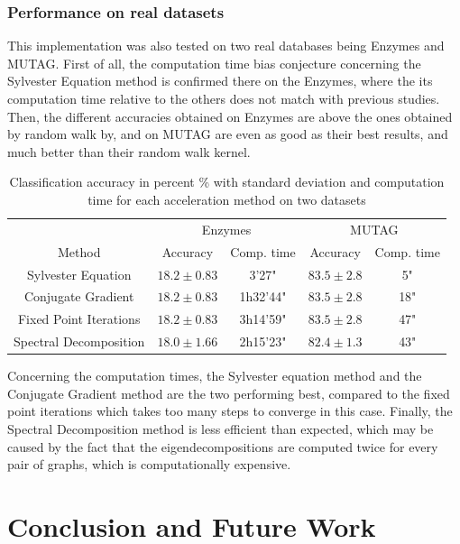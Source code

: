 \documentclass{article}
\theoremstyle{definition}
\begin{document}
\subsubsection{Performance on real datasets}
This implementation was also tested on two real databases being Enzymes and MUTAG. First of all, the computation time bias conjecture concerning the Sylvester Equation method is confirmed there on the Enzymes, where the its computation time relative to the others does not match with previous studies\cite{vishwanathan_graph_2010,shervashidze_efficient_2009}. Then, the different accuracies obtained on Enzymes are above the ones obtained by random walk by\cite{shervashidze_efficient_2009}, and on MUTAG are even as good as their best results, and much better than their random walk kernel.
\begin{table}[!htb]
	\begin{center}
		\begin{tabular}{|c||c|c||c|c|}
			\hline
			& \multicolumn{2}{c||}{Enzymes} & \multicolumn{2}{|c|}{MUTAG}\\
			\cline{2-5}
			Method & Accuracy  & Comp. time & Accuracy & Comp. time\\
			\hline 
			Sylvester Equation & $18.2\pm 0.83$ & 3'27" & $83.5\pm 2.8$ & 5"\\
			Conjugate Gradient & $18.2\pm 0.83$ & 1h32'44" & $83.5\pm 2.8$ & 18"\\
			Fixed Point Iterations & $18.2\pm 0.83$ & 3h14'59" & $83.5\pm 2.8$ & 47" \\
			Spectral Decomposition & $18.0\pm 1.66$ & 2h15'23" & $82.4\pm 1.3$ & 43"\\
			\hline
		\end{tabular}
	\end{center}
\caption{Classification accuracy in percent \% with standard deviation and computation time for each acceleration method on two datasets}
\end{table}
Concerning the computation times, the Sylvester equation method and the Conjugate Gradient method are the two performing best, compared to the fixed point iterations which takes too many steps to converge in this case. Finally, the Spectral Decomposition method is less efficient than expected, which may be caused by the fact that the eigendecompositions are computed twice for every pair of graphs, which is computationally expensive. 

\section{Conclusion and Future Work}
\end{document}
